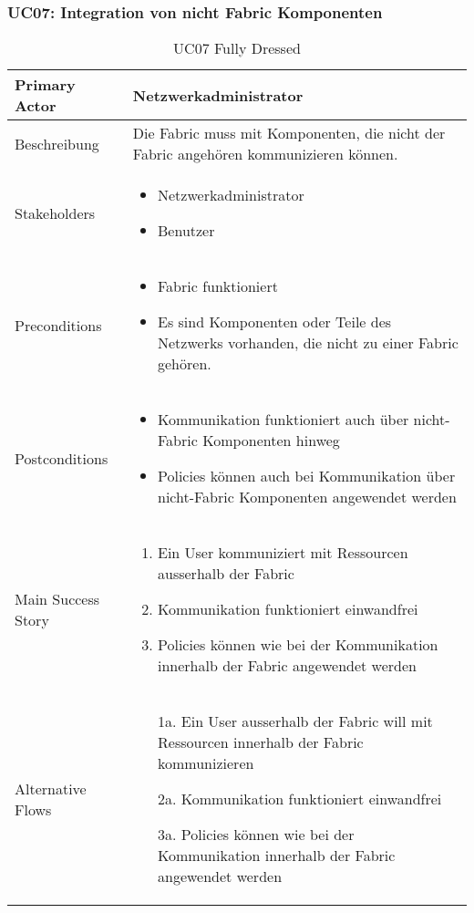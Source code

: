 \subsubsection{UC07: Integration von nicht Fabric Komponenten}
\begin{table}[H]
	\centering
	\begin{tabularx}{\textwidth}{l | X}
		Primary Actor   & Netzwerkadministrator       \\
		\hline
		Beschreibung   & Die Fabric muss mit Komponenten, die nicht der Fabric angehören kommunizieren können.  \\ 
		\hline
		Stakeholders       & 
		\begin{itemize}
			\item Netzwerkadministrator
			\item Benutzer
		\end{itemize} \\ 
		Preconditions      &
		\begin{itemize}	
			\item Fabric funktioniert
			\item Es sind Komponenten oder Teile des Netzwerks vorhanden, die nicht zu einer Fabric gehören.
		\end{itemize}  \\
		\hline
		Postconditions     & 
		\begin{itemize}	
			\item Kommunikation funktioniert auch über nicht-Fabric Komponenten hinweg
			\item Policies können auch bei Kommunikation über nicht-Fabric Komponenten angewendet werden
		\end{itemize}  \\
		\hline
		Main Success Story & 
		\begin{enumerate}
			\item Ein User kommuniziert mit Ressourcen ausserhalb der Fabric
			\item Kommunikation funktioniert einwandfrei
			\item Policies können wie bei der Kommunikation innerhalb der Fabric angewendet werden
		\end{enumerate}
		\\
		\hline
		Alternative Flows  & 
		\begin{itemize}
			\item[1a.]  Ein User ausserhalb der Fabric will mit Ressourcen innerhalb der Fabric kommunizieren
			\item[2a.] Kommunikation funktioniert einwandfrei
			\item[3a.] Policies können wie bei der Kommunikation innerhalb der Fabric angewendet werden
		\end{itemize}
	\end{tabularx}
	\caption{UC07 Fully Dressed}
	\label{tab:UC07}
\end{table}

